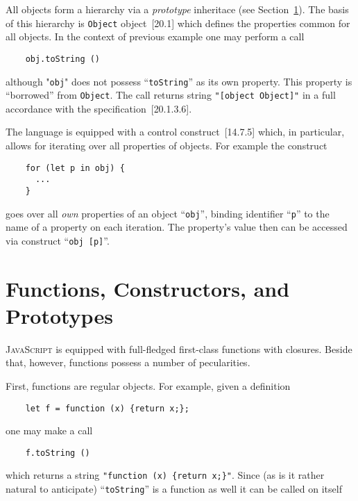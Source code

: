 \documentclass{article}
\newcommand{\js}{\textsc{JavaScript}\xspace}
\newcommand{\rf}[1]{[\textsc{#1}]}
\newcommand{\out}[1]{\texttt{#1}}
\begin{document}
All objects form a hierarchy via a \emph{prototype} inheritace (see Section~\ref{sec:prototype}). The basis of
this hierarchy is \lstinline|Object| object~\rf{20.1} which defines the properties common for all objects.
In the context of previous example one may perform a call

\begin{lstlisting}
    obj.toString ()
\end{lstlisting}

although "\lstinline|obj|" does not possess ``\lstinline|toString|'' as its own property. This property is ``borrowed''
from \lstinline|Object|. The call returns string \out{"[object Object]"} in a full accordance with the
specification~\rf{20.1.3.6}.

The language is equipped with a control construct~\rf{14.7.5} which, in particular, allows for iterating over
all properties of objects. For example the construct

\begin{lstlisting}
    for (let p in obj) {
      ...
    }
\end{lstlisting}

goes over all \emph{own} properties of an object ``\lstinline|obj|'', binding identifier ``\lstinline|p|'' to the
name of a property on each iteration. The property's value then can be accessed via construct ``\lstinline|obj [p]|''.

\section{Functions, Constructors, and Prototypes}
\label{sec:prototype}

\js is equipped with full-fledged first-class functions with closures. Beside that, however, functions possess a number of pecularities.

First, functions are regular objects. For example, given a definition

\begin{lstlisting}
    let f = function (x) {return x;};
\end{lstlisting}

one may make a call

\begin{lstlisting}
    f.toString ()
\end{lstlisting}

which returns a string \out{"function (x) \{return x;\}"}. Since (as is it rather natural to anticipate) ``\lstinline|toString|''
is a function as well it can be called on itself
\end{document}
